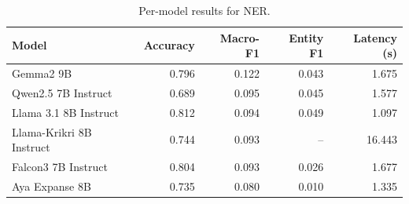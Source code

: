 \begin{table}[t]
\centering
\caption{Per-model results for NER.}
\label{tab:appendix-ner-analysis}
\begin{tabular}{lrrrr}
\toprule
Model & Accuracy & Macro-F1 & Entity F1 & Latency (s) \\
\midrule
Gemma2 9B & 0.796 & 0.122 & 0.043 & 1.675 \\
Qwen2.5 7B Instruct & 0.689 & 0.095 & 0.045 & 1.577 \\
Llama 3.1 8B Instruct & 0.812 & 0.094 & 0.049 & 1.097 \\
Llama-Krikri 8B Instruct & 0.744 & 0.093 & -- & 16.443 \\
Falcon3 7B Instruct & 0.804 & 0.093 & 0.026 & 1.677 \\
Aya Expanse 8B & 0.735 & 0.080 & 0.010 & 1.335 \\
\bottomrule
\end{tabular}
\end{table}
